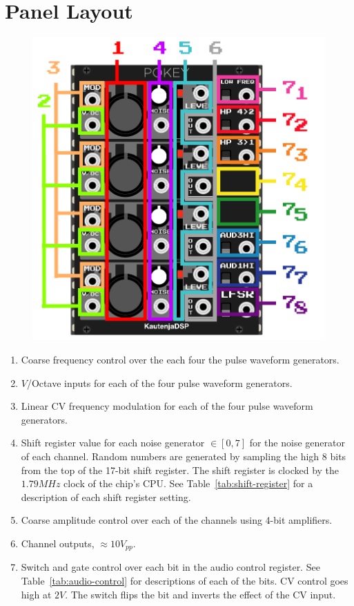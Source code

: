 \documentclass[12pt,a4paper]{article}
\begin{document}
\section{Panel Layout}
\begin{figure}[!htp]
\centering
\includegraphics{POKEY-Manual}
\end{figure}

\clearpage
\begin{enumerate}
  \item Coarse frequency control over the each four the pulse waveform generators.
  \item $V$/Octave inputs for each of the four pulse waveform generators.
  \item Linear CV frequency modulation for each of the four pulse waveform generators.
  \item Shift register value for each noise generator $\in [0, 7]$ for the noise generator of each channel. Random numbers are generated by sampling the high 8 bits from the top of the 17-bit shift register. The shift register is clocked by the $1.79MHz$ clock of the chip's CPU. See Table~\ref{tab:shift-register} for a description of each shift register setting.
  \item Coarse amplitude control over each of the channels using 4-bit amplifiers.
  \item Channel outputs, ${\approx}10V_{pp}$.
  \item Switch and gate control over each bit in the audio control register. See Table~\ref{tab:audio-control} for descriptions of each of the bits. CV control goes high at $2V$. The switch flips the bit and inverts the effect of the CV input.
\end{enumerate}
\end{document}
